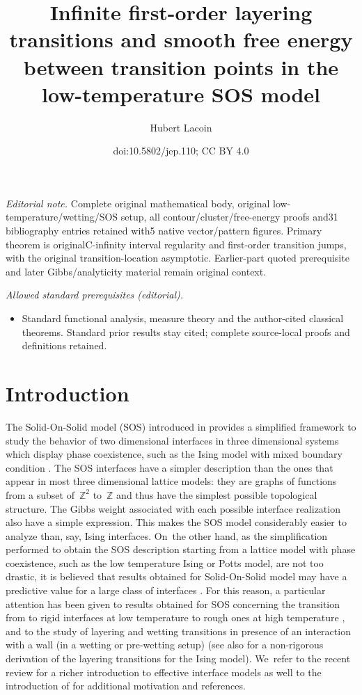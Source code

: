 \documentclass[10pt]{amsart}
\title{Infinite first-order layering transitions and smooth free energy between transition points in the low-temperature SOS model}
\author{Hubert Lacoin}
\date{doi:10.5802/jep.110; CC BY 4.0}
\numberwithin{equation}{section}
\theoremstyle{plain}
\theoremstyle{definition}
\newcommand{\bbZ}{{\ensuremath{\mathbb Z}} }
\begin{document}
\maketitle
\noindent\textit{Editorial note.} Complete original mathematical body, original low-temperature/wetting/SOS setup, all contour/cluster/free-energy proofs and31 bibliography entries retained with5 native vector/pattern figures. Primary theorem is originalC-infinity interval regularity and first-order transition jumps, with the original transition-location asymptotic. Earlier-part quoted prerequisite and later Gibbs/analyticity material remain original context.\par\medskip
\noindent\textit{Allowed standard prerequisites (editorial).}\begin{itemize}
\item Standard functional analysis, measure theory and the author-cited classical theorems. Standard prior results stay cited; complete source-local proofs and definitions retained.
\end{itemize}\medskip
\tableofcontents


\section{Introduction}

The Solid-On-Solid model (SOS) introduced in \cite{cf:BCF, cf:T} provides a simplified framework
to study the behavior of two dimensional interfaces in three dimensional systems which display phase coexistence,
such as the Ising model with mixed boundary condition \cite{cf:Dob}.
The SOS interfaces have a simpler description than the ones that appear in most three dimensional lattice models: they are graphs of functions from a subset of~$\bbZ^2$ to~$\bbZ$ and thus have the simplest possible topological structure. The Gibbs weight associated with each possible interface realization also
have a simple expression.
This makes the SOS model considerably easier to analyze than, say, Ising interfaces. On~the other hand, as the simplification performed to obtain
the SOS description starting from a lattice model with phase coexistence, such as the low temperature Ising or Potts model, are not too drastic,
it is believed that results obtained for Solid-On-Solid model may have a predictive value for a large class of interfaces \cite{cf:BCF,cf:T,cf:WGL}.
For this reason, a particular attention has been given to results obtained for SOS concerning the transition from
to rigid interfaces at low temperature to rough ones at high temperature \cite{cf:BM, cf:FS, cf:Swend}, and to the study of layering and wetting transitions
in presence of an interaction with a wall (in a wetting or pre-wetting setup) \cite{cf:ADM, cf:AY, cf:BMF,cf:CM, cf:CM2, cf:chal,cf:DM} (see also \cite{cf:Bas} for a non-rigorous derivation of the layering transitions for the Ising model).
We~refer to the recent review \cite{cf:IV} for a richer introduction to effective interface models as well to the introduction of \cite{cf:part1}
for additional motivation and references.
\end{document}
